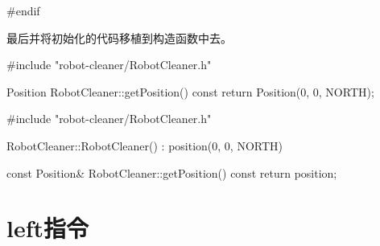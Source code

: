 \begin{content}
\begin{minipage}[t]{0.45\linewidth}
\begin{c++}[caption={include/robot-cleaner/RobotCleaner.h}]
#endif
\end{c++}
\end{minipage}%

最后并将初始化的代码移植到构造函数中去。

\begin{minipage}[t]{0.45\linewidth}
\begin{c++}[caption={src/robot-cleaner/RobotCleaner.cpp}]
#include "robot-cleaner/RobotCleaner.h"

Position RobotCleaner::getPosition() const
{
    return Position(0, 0, NORTH);
}
\end{c++}
\end{minipage}%
\hfill\vrule\hfill
\begin{minipage}[t]{0.45\linewidth}
\begin{c++}[caption={src/robot-cleaner/RobotCleaner.cpp}]
#include "robot-cleaner/RobotCleaner.h"

RobotCleaner::RobotCleaner()
  : position(0, 0, NORTH)
{}

const Position& RobotCleaner::getPosition() const
{
    return position;
}
\end{c++}
\end{minipage}%

\end{content}

\section{left指令}

